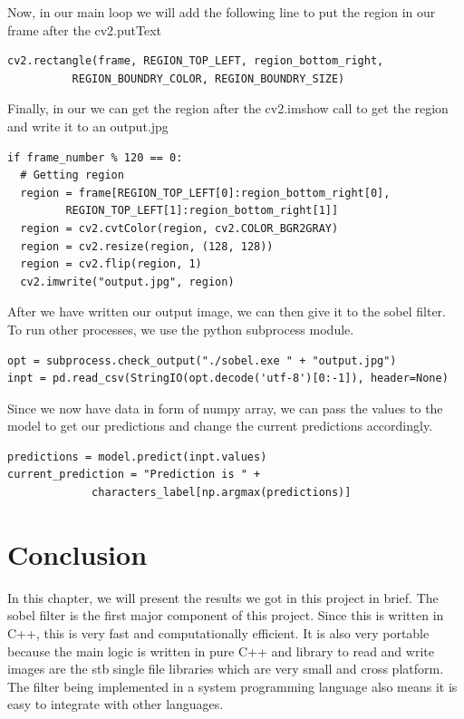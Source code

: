 \documentclass[a4paper,oneside,12pt]{report}
\begin{document}
Now, in our main loop we will add the following line to put the region in our frame after the cv2.putText
\begin{verbatim}
cv2.rectangle(frame, REGION_TOP_LEFT, region_bottom_right,
	      REGION_BOUNDRY_COLOR, REGION_BOUNDRY_SIZE)
\end{verbatim}

Finally, in our we can get the region after the cv2.imshow call to get the region and write it to an output.jpg
\begin{verbatim}
if frame_number % 120 == 0:
  # Getting region
  region = frame[REGION_TOP_LEFT[0]:region_bottom_right[0],
		 REGION_TOP_LEFT[1]:region_bottom_right[1]]
  region = cv2.cvtColor(region, cv2.COLOR_BGR2GRAY)
  region = cv2.resize(region, (128, 128))
  region = cv2.flip(region, 1)
  cv2.imwrite("output.jpg", region)
\end{verbatim}

After we have written our output image, we can then give it to the sobel filter. To run other processes, we use the python subprocess module.
\begin{verbatim}
opt = subprocess.check_output("./sobel.exe " + "output.jpg")
inpt = pd.read_csv(StringIO(opt.decode('utf-8')[0:-1]), header=None)
\end{verbatim}

Since we now have data in form of numpy array, we can pass the values to the model to get our predictions and change the current predictions accordingly.
\begin{verbatim}
predictions = model.predict(inpt.values)
current_prediction = "Prediction is " +
		     characters_label[np.argmax(predictions)]
\end{verbatim}

\chapter{Conclusion}
\label{sec:orgb320f12}
In this chapter, we will present the results we got in this project in brief. The sobel filter is the first major component of this project. Since this is written in C++, this is very fast and computationally efficient. It is also very portable because the main logic is written in pure C++ and library to read and write images are the stb single file libraries \citep{stblibraries} which are very small and cross platform. The filter being implemented in a system programming language also means it is easy to integrate with other languages.
\end{document}
